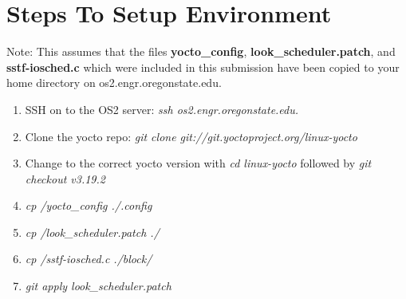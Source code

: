 \documentclass[onecolumn,draftclsnofoot, 10pt, compsoc]{IEEEtran}
\begin{document}
\section{Steps To Setup Environment}
	Note: This assumes that the files \textbf{yocto\_config}, \textbf{look\_scheduler.patch}, and \textbf{sstf-iosched.c} which were included in this submission have been copied to your home directory on os2.engr.oregonstate.edu.
	\begin{enumerate}
		\item
			SSH on to the OS2 server: \textit{ssh os2.engr.oregonstate.edu. }
		\item
			Clone the yocto repo: \textit{git clone git://git.yoctoproject.org/linux-yocto}
		\item 
			Change to the correct yocto version with \textit{cd linux-yocto} followed by \textit{git checkout v3.19.2}
		\item 
			\textit{cp \texttildelow/yocto\_config ./.config}
		\item 
			\textit{cp \texttildelow/look\_scheduler.patch ./}
		\item 
			\textit{cp \texttildelow/sstf-iosched.c ./block/}
		\item 
			\textit{git apply look\_scheduler.patch}
	\end{enumerate}
\end{document}
